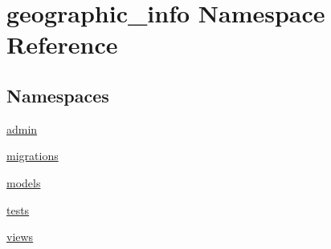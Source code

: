 \hypertarget{namespacegeographic__info}{\section{geographic\-\_\-info Namespace Reference}
\label{namespacegeographic__info}
}
\subsection*{Namespaces}
\begin{DoxyCompactItemize}
\item 
\hyperlink{namespacegeographic__info_1_1admin}{admin}
\item 
\hyperlink{namespacegeographic__info_1_1migrations}{migrations}
\item 
\hyperlink{namespacegeographic__info_1_1models}{models}
\item 
\hyperlink{namespacegeographic__info_1_1tests}{tests}
\item 
\hyperlink{namespacegeographic__info_1_1views}{views}
\end{DoxyCompactItemize}
